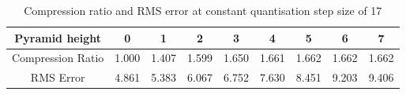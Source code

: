 \begin{table}[h]
    \centering
    \begin{tabular}{|c|c|c|c|c|c|c|c|c|}
    \hline
        Pyramid height & 0 & 1 & 2 & 3 & 4 & 5 & 6 & 7 \\
        \hline
        Compression Ratio & 1.000 & 1.407 & 1.599 & 1.650 & 1.661 & 1.662 & 1.662 & 1.662\\
        \hline
        RMS Error & 4.861 & 5.383 & 6.067 & 6.752 & 7.630 & 8.451 & 9.203 & 9.406 \\
        \hline
    \end{tabular}
    \caption{Compression ratio and RMS error at constant quantisation step size of 17}
    \label{tab:const_step}
    \vspace{-0.7cm}
\end{table}
